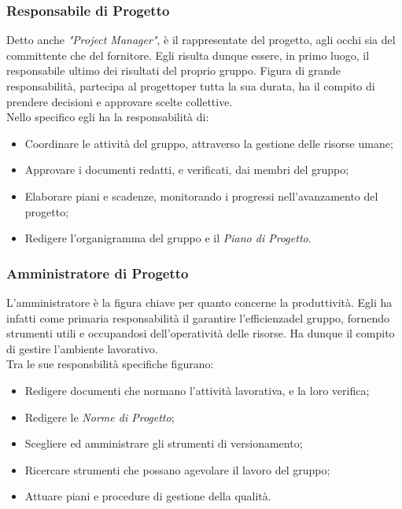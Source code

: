 \subsubsection{Responsabile di Progetto}
	Detto anche \textit{"Project Manager"}, è il rappresentate del progetto\glossario, agli occhi sia del committente che del 			fornitore. Egli risulta dunque essere, in primo luogo, il responsabile ultimo dei risultati del proprio gruppo. 			Figura di grande responsabilità, partecipa al progetto\glossario per tutta la sua durata, ha il compito di prendere 						decisioni 	e approvare scelte collettive.\\
	Nello specifico egli ha la responsabilità di:
	\begin{itemize}
	\item Coordinare le attività del gruppo, attraverso la gestione delle risorse umane;
	\item Approvare i documenti redatti, e verificati, dai membri del gruppo;
	\item Elaborare piani e scadenze, monitorando i progressi nell'avanzamento del progetto\glossario;
	\item Redigere l'organigramma del gruppo e il \textit{Piano di Progetto}\glossario.
	\end{itemize}

\subsubsection{Amministratore di Progetto}
	L'amministratore è la figura chiave per quanto concerne la produttività. Egli ha infatti come primaria 							responsabilità il garantire l'efficienza\glossario del gruppo, fornendo strumenti utili e occupandosi 								dell'operatività delle risorse. Ha dunque il compito di gestire l'ambiente lavorativo.\\
	Tra le sue responsbilità specifiche figurano:
	\begin{itemize}
	\item Redigere documenti che normano l'attività lavorativa, e la loro verifica\glossario;
	\item Redigere le \textit{Norme di Progetto}\glossario;
	\item Scegliere ed amministrare gli strumenti di versionamento\glossario;
	\item Ricercare strumenti che possano agevolare il lavoro del gruppo;
	\item Attuare piani e procedure di gestione della qualità\glossario.
	\end{itemize}

